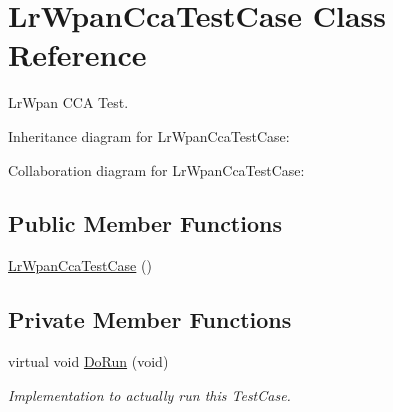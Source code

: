\hypertarget{classLrWpanCcaTestCase}{}\section{Lr\+Wpan\+Cca\+Test\+Case Class Reference}
\label{classLrWpanCcaTestCase}


Lr\+Wpan C\+CA Test.  




Inheritance diagram for Lr\+Wpan\+Cca\+Test\+Case\+:


Collaboration diagram for Lr\+Wpan\+Cca\+Test\+Case\+:
\subsection*{Public Member Functions}
\begin{DoxyCompactItemize}
\item 
\hyperlink{classLrWpanCcaTestCase_aeead12010707611f14b0343cbe16d87d}{Lr\+Wpan\+Cca\+Test\+Case} ()
\end{DoxyCompactItemize}
\subsection*{Private Member Functions}
\begin{DoxyCompactItemize}
\item 
virtual void \hyperlink{classLrWpanCcaTestCase_a3e2872a3bd57d754a2bdb613437e18a8}{Do\+Run} (void)
\begin{DoxyCompactList}\small\item\em Implementation to actually run this Test\+Case. \end{DoxyCompactList}\end{DoxyCompactItemize}
